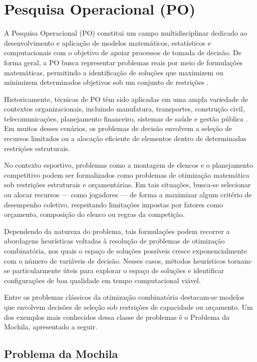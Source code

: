 \section{Pesquisa Operacional (PO)}

A Pesquisa Operacional (PO) constitui um campo multidisciplinar dedicado ao desenvolvimento e aplicação de modelos matemáticos, estatísticos e computacionais com o 
objetivo de apoiar processos de tomada de decisão. De forma geral, a PO busca representar problemas reais por meio de formulações matemáticas, 
permitindo a identificação de soluções que maximizem ou minimizem determinados objetivos sob um conjunto de restrições \cite{Hillier2001}.

Historicamente, técnicas de PO têm sido aplicadas em uma ampla variedade de contextos organizacionais, incluindo manufatura, transportes, construção civil, 
telecomunicações, planejamento financeiro, sistemas de saúde e gestão pública \cite{Hillier2001}. Em muitos desses cenários, os problemas de decisão 
envolvem a seleção de recursos limitados ou a alocação eficiente de elementos dentro de determinadas restrições estruturais.

No contexto esportivo, problemas como a montagem de elencos e o planejamento competitivo podem ser formalizados como problemas de otimização matemática sob 
restrições estruturais e orçamentárias. Em tais situações, busca-se selecionar ou alocar recursos — como jogadores — de forma a maximizar algum critério de 
desempenho coletivo, respeitando limitações impostas por fatores como orçamento, composição do elenco ou regras da competição.

Dependendo da natureza do problema, tais formulações podem recorrer a abordagens heurísticas voltadas à resolução de problemas de otimização combinatória, 
nos quais o espaço de soluções possíveis cresce exponencialmente com o número de variáveis de decisão. Nesses casos, métodos heurísticos tornam-se particularmente 
úteis para explorar o espaço de soluções e identificar configurações de boa qualidade em tempo computacional viável.

Entre os problemas clássicos da otimização combinatória destacam-se modelos que envolvem decisões de seleção sob restrições de capacidade ou orçamento. 
Um dos exemplos mais conhecidos dessa classe de problemas é o Problema da Mochila, apresentado a seguir.

\subsection{Problema da Mochila}

